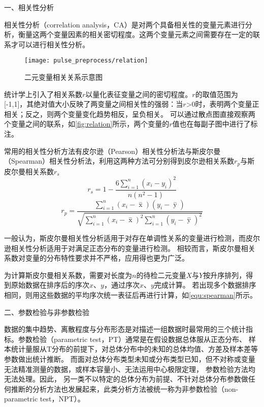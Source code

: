 一、相关性分析

相关性分析（correlation analysis，CA）是对两个具备相关性的变量元素进行分析，衡量这两个变量因素的相关密切程度\cite{Zhang2019}。这两个变量元素之间需要存在一定的联系才可以进行相关性分析。

\begin{figure}[htbp]
    \centering
    \texttt{[image: pulse\_preprocess/relation]}
    \caption[二元变量相关关系示意图]{\label{fig:relation}二元变量相关关系示意图\cite{IXL2022}}
\end{figure}

统计学上引入了相关系数$r$以量化表征变量之间的密切程度。$r$的取值范围为[-1,1]，其绝对值大小反映了两变量之间相关性的强弱：当$r$>0时，表明两个变量正相关；反之，则两个变量变化趋势相反，呈负相关。
可以通过散点图直接观察两个变量之间的联系，如\autoref{fig:relation}所示，两个变量的$r$值也在每副子图中进行了标注。

常用的相关性分析方法有皮尔逊（Pearson）相关性分析法与斯皮尔曼（Spearman）相关性分析法，利用这两种方法可分别得到皮尔逊相关系数$r_p$与斯皮尔曼相关系数$r_s$
\begin{equation}
    \label{equ:spearman}
    r_s=1-\frac{6\sum_{i=1}^{n}(x_{i}-y_{i})^2}{n(n^2-1)}
\end{equation}
\begin{equation}
    \label{equ:pearson}
    r_p=\frac{\sum_{i=1}^n{(x_i- \mathop{x} \limits^-)(y_i- \mathop{y} \limits^-)}}{\sqrt{{\sum_{i=1}^n}{{(x_i- \mathop{x} \limits^-)^2\sum_{i=1}^n}{(y_i- \mathop{y} \limits^-)^2}}}}
\end{equation}

一般认为，斯皮尔曼相关性分析适用于对存在单调性关系的变量进行检测，而皮尔逊相关性分析适用于对满足正态分布的变量进行检测。
相较而言，斯皮尔曼相关系数对变量的分布特性要求并不严格，应用得也更为广泛。

为计算斯皮尔曼相关系数，需要对长度为$n$的待检二元变量$X$与$Y$按升序排列，得到原始数据在排序后的序次$x$、$y$，通过序次$x$、$y$完成计算。
若出现多个数据排序相同，则用这些数据的平均序次统一表征后再进行计算，如\autoref{equ:spearman}所示。

二、参数检验与非参数检验

数据的集中趋势、离散程度与分布形态是对描述一组数据时最常用的三个统计指标。参数检验（parametric test，PT）通常是在假设数据总体服从正态分布、
样本统计量服从T分布的前提下，对总体分布中的未知的总体均值、方差及样本差等参数做出统计推断。
而面对总体分布类型未知或分布类型已知，但不对称或变量无法精准测量的数据，或样本容量小、无法运用中心极限定理，
参数检验方法均无法处理。因此，
另一类不以特定的总体分布为前提、不针对总体分布参数做任何推断的分析方法也发展起来，此类分析方法被统一称为非参数检验（non-parametric test，NPT）\cite{Guo2017,Zhang2019}。

